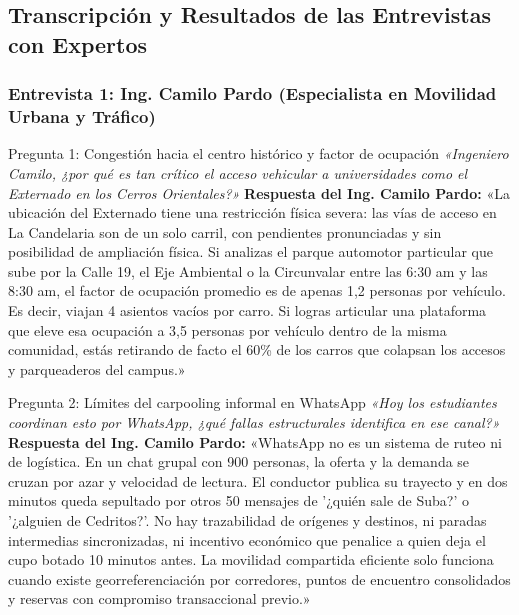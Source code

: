 \documentclass[11pt,a4paper]{article}
\begin{document}
\subsection{Transcripción y Resultados de las Entrevistas con Expertos}

\subsubsection{Entrevista 1: Ing. Camilo Pardo (Especialista en Movilidad Urbana y Tráfico)}

\begin{evidencebox}{Pregunta 1: Congestión hacia el centro histórico y factor de ocupación}
\textit{«Ingeniero Camilo, ¿por qué es tan crítico el acceso vehicular a universidades como el Externado en los Cerros Orientales?»}
\tcblower
\textbf{Respuesta del Ing. Camilo Pardo:}  
«La ubicación del Externado tiene una restricción física severa: las vías de acceso en La Candelaria son de un solo carril, con pendientes pronunciadas y sin posibilidad de ampliación física. Si analizas el parque automotor particular que sube por la Calle 19, el Eje Ambiental o la Circunvalar entre las 6:30 am y las 8:30 am, el factor de ocupación promedio es de apenas 1,2 personas por vehículo. Es decir, viajan 4 asientos vacíos por carro. Si logras articular una plataforma que eleve esa ocupación a 3,5 personas por vehículo dentro de la misma comunidad, estás retirando de facto el 60\% de los carros que colapsan los accesos y parqueaderos del campus.»
\end{evidencebox}

\begin{evidencebox}{Pregunta 2: Límites del carpooling informal en WhatsApp}
\textit{«Hoy los estudiantes coordinan esto por WhatsApp, ¿qué fallas estructurales identifica en ese canal?»}
\tcblower
\textbf{Respuesta del Ing. Camilo Pardo:}  
«WhatsApp no es un sistema de ruteo ni de logística. En un chat grupal con 900 personas, la oferta y la demanda se cruzan por azar y velocidad de lectura. El conductor publica su trayecto y en dos minutos queda sepultado por otros 50 mensajes de '¿quién sale de Suba?' o '¿alguien de Cedritos?'. No hay trazabilidad de orígenes y destinos, ni paradas intermedias sincronizadas, ni incentivo económico que penalice a quien deja el cupo botado 10 minutos antes. La movilidad compartida eficiente solo funciona cuando existe georreferenciación por corredores, puntos de encuentro consolidados y reservas con compromiso transaccional previo.»
\end{evidencebox}
\end{document}

